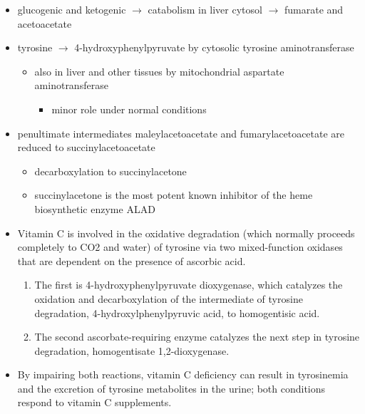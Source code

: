 \documentclass[12pt]{scrartcl}
\begin{document}
\begin{center}
\chemnameinit{}
\end{center}

\begin{itemize}
\item glucogenic and ketogenic \(\to\) catabolism in liver cytosol \(\to\) fumarate and acetoacetate
\item tyrosine \(\to\) 4-hydroxyphenylpyruvate by cytosolic tyrosine aminotransferase
\begin{itemize}
\item also in liver and other tissues by mitochondrial aspartate aminotransferase
\begin{itemize}
\item minor role under normal conditions
\end{itemize}
\end{itemize}
\item penultimate intermediates maleylacetoacetate and fumarylacetoacetate
are reduced to succinylacetoacetate
\begin{itemize}
\item decarboxylation to succinylacetone
\item succinylacetone is the most potent known inhibitor of the heme biosynthetic enzyme ALAD
\end{itemize}

\item Vitamin C is involved in the oxidative degradation (which normally
proceeds completely to CO2 and water) of tyrosine via two
mixed-function oxidases that are dependent on the presence of
ascorbic acid.
\begin{enumerate}
\item The first is 4-hydroxyphenylpyruvate dioxygenase, which catalyzes
the oxidation and decarboxylation of the intermediate of tyrosine
degradation, 4-hydroxylphenylpyruvic acid, to homogentisic
acid.
\item The second ascorbate-requiring enzyme catalyzes the next
step in tyrosine degradation, homogentisate 1,2-dioxygenase.
\end{enumerate}
\item By impairing both reactions, vitamin C deficiency can result in
tyrosinemia and the excretion of tyrosine metabolites in the
urine; both conditions respond to vitamin C supplements.
\end{itemize}
\end{document}
